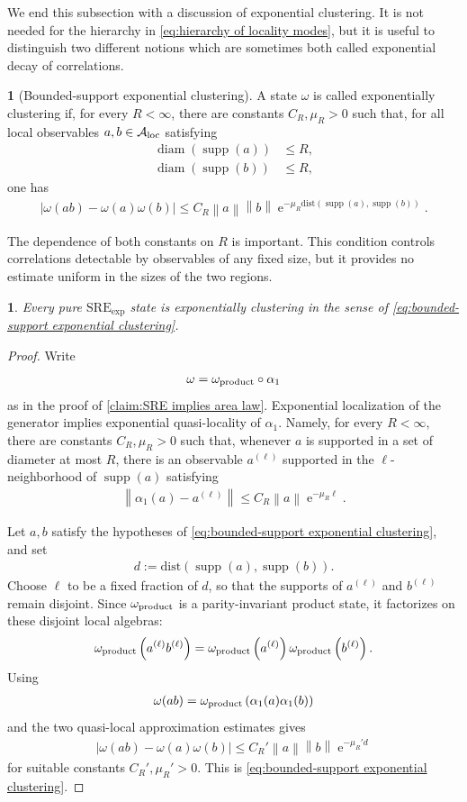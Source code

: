 \documentclass[a4paper,10pt]{article}
\numberwithin{equation}{section}
\theoremstyle{plain}
\theoremstyle{plain}
\theoremstyle{plain}
\theoremstyle{plain}
\theoremstyle{plain}
\newtheorem{claim}[claim]{\protect\claimname}
\theoremstyle{remark}
\theoremstyle{definition}
\newtheorem{defn}[defn]{\protect\definitionname}
\providecommand{\claimname}{Claim}
\providecommand{\definitionname}{Definition}
\newcommand{\ee}{\operatorname{e}}
\newcommand{\calA}{\mathcal{A}}
\newcommand\norm[1]{\left\lVert#1\right\rVert}
\newcommand{\dist}{\mathrm{dist}}
\newcommand{\supp}{\operatorname{supp}}
\newcommand{\diam}{\operatorname{diam}}
\newcommand{\eq}[1]{\begin{align*}#1\end{align*}}
\newcommand{\eql}[1]{\begin{align}#1\end{align}}
\newcommand{\br}[1]{\left(#1\right)}
\begin{document}
We end this subsection with a discussion of exponential clustering. It
is not needed for the hierarchy in
\cref{eq:hierarchy of locality modes}, but it is useful to distinguish
two different notions which are sometimes both called exponential
decay of correlations.

\begin{defn}[Bounded-support exponential clustering]
A state $\omega$ is called exponentially clustering if, for every
$R<\infty$, there are constants $C_R,\mu_R>0$ such that, for all local
observables $a,b\in\calA_{\rm loc}$ satisfying
\eq{
    \diam\br{\supp(a)}
    &\leq
    R,\\
    \diam\br{\supp(b)}
    &\leq
    R,
}
one has
\eql{\label{eq:bounded-support exponential clustering}
    \left|
        \omega(ab)-\omega(a)\omega(b)
    \right|
    \leq
    C_R
    \norm{a}
    \norm{b}
    \ee^{
        -\mu_R
        \dist\br{
            \supp(a),
            \supp(b)
        }
    }.
}
\end{defn}

The dependence of both constants on $R$ is important. This condition
controls correlations detectable by observables of any fixed size, but
it provides no estimate uniform in the sizes of the two regions.

\begin{claim}
\label{claim:SRE implies bounded support clustering}
Every pure $\mathrm{SRE}_{\exp}$ state is exponentially clustering in
the sense of
\cref{eq:bounded-support exponential clustering}.
\end{claim}

\begin{proof}
Write
\eq{
    \omega
    =
    \omega_{\rm product}\circ\alpha_1
}
as in the proof of
\cref{claim:SRE implies area law}. Exponential localization of the
generator implies exponential quasi-locality of $\alpha_1$. Namely, for
every $R<\infty$, there are constants $C_R,\mu_R>0$ such that, whenever
$a$ is supported in a set of diameter at most $R$, there is an
observable $a^{(\ell)}$ supported in the $\ell$-neighborhood of
$\supp(a)$ satisfying
\eq{
    \norm{
        \alpha_1(a)-a^{(\ell)}
    }
    \leq
    C_R
    \norm{a}
    \ee^{-\mu_R\ell}.
}

Let $a,b$ satisfy the hypotheses of
\cref{eq:bounded-support exponential clustering}, and set
\eq{
    d
    :=
    \dist\br{
        \supp(a),
        \supp(b)
    }.
}
Choose $\ell$ to be a fixed fraction of $d$, so that the supports of
$a^{(\ell)}$ and $b^{(\ell)}$ remain disjoint. Since
$\omega_{\rm product}$ is a parity-invariant product state, it
factorizes on these disjoint local algebras:
\eq{
    \omega_{\rm product}
    \br{
        a^{(\ell)}b^{(\ell)}
    }
    =
    \omega_{\rm product}
    \br{
        a^{(\ell)}
    }
    \omega_{\rm product}
    \br{
        b^{(\ell)}
    }.
}
Using
\eq{
    \omega(ab)
    =
    \omega_{\rm product}
    \br{
        \alpha_1(a)\alpha_1(b)
    }
}
and the two quasi-local approximation estimates gives
\eq{
    \left|
        \omega(ab)-\omega(a)\omega(b)
    \right|
    \leq
    C_R'
    \norm{a}
    \norm{b}
    \ee^{-\mu_R'd}
}
for suitable constants $C_R',\mu_R'>0$. This is
\cref{eq:bounded-support exponential clustering}.
\end{proof}
\end{document}
